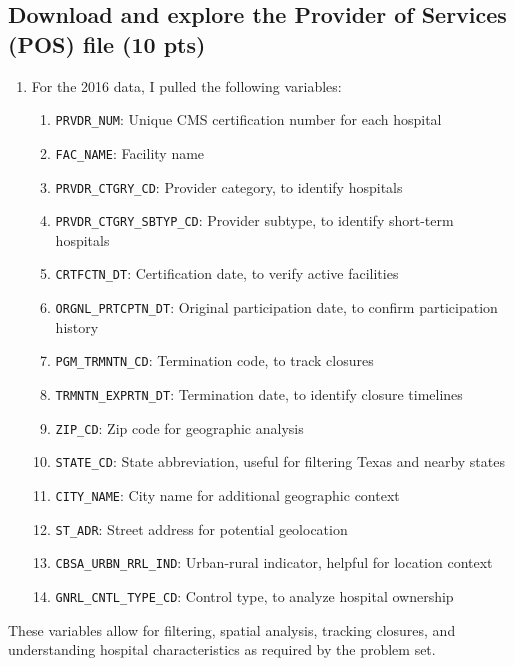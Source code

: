 \documentclass[
  letterpaper,
  DIV=11,
  numbers=noendperiod]{scrartcl}
\providecommand{\tightlist}{%
  \setlength{\itemsep}{0pt}\setlength{\parskip}{0pt}}\usepackage{longtable,booktabs,array}
\begin{document}
\subsection{Download and explore the Provider of Services (POS) file (10
pts)}\label{download-and-explore-the-provider-of-services-pos-file-10-pts}

\begin{enumerate}
\def\labelenumi{\arabic{enumi}.}
\item
  For the 2016 data, I pulled the following variables:

  \begin{enumerate}
  \def\labelenumii{\roman{enumii}.}
  \tightlist
  \item
    \texttt{PRVDR\_NUM}: Unique CMS certification number for each
    hospital
  \item
    \texttt{FAC\_NAME}: Facility name
  \item
    \texttt{PRVDR\_CTGRY\_CD}: Provider category, to identify hospitals
  \item
    \texttt{PRVDR\_CTGRY\_SBTYP\_CD}: Provider subtype, to identify
    short-term hospitals
  \item
    \texttt{CRTFCTN\_DT}: Certification date, to verify active
    facilities
  \item
    \texttt{ORGNL\_PRTCPTN\_DT}: Original participation date, to confirm
    participation history
  \item
    \texttt{PGM\_TRMNTN\_CD}: Termination code, to track closures
  \item
    \texttt{TRMNTN\_EXPRTN\_DT}: Termination date, to identify closure
    timelines
  \item
    \texttt{ZIP\_CD}: Zip code for geographic analysis
  \item
    \texttt{STATE\_CD}: State abbreviation, useful for filtering Texas
    and nearby states
  \item
    \texttt{CITY\_NAME}: City name for additional geographic context
  \item
    \texttt{ST\_ADR}: Street address for potential geolocation
  \item
    \texttt{CBSA\_URBN\_RRL\_IND}: Urban-rural indicator, helpful for
    location context
  \item
    \texttt{GNRL\_CNTL\_TYPE\_CD}: Control type, to analyze hospital
    ownership
  \end{enumerate}
\end{enumerate}

These variables allow for filtering, spatial analysis, tracking
closures, and understanding hospital characteristics as required by the
problem set.
\end{document}
